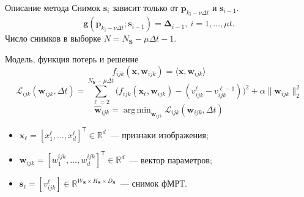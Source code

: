 \documentclass{beamer}
\newcommand{\T}{^{\mathsf{T}}}
\DeclareMathOperator*{\argmin}{arg\,min}  %
\begin{document}
\begin{frame}{Описание метода}
    Снимок $\mathbf{s}_i$ зависит только от $\mathbf{p}_{k_i - \nu \Delta t}$ и $\mathbf{s}_{i-1}$.
	\begin{equation*}
		\label{eq4}
		\mathbf{g}(\mathbf{p}_{k_i - \nu \Delta t}; \mathbf{s}_{i-1}) = \mathbf{\Delta}_{i-1}, \ i = 1, \ldots, \mu t.
	\end{equation*}
    Число снимков в выборке $N = N_{\mathbf{S}} - \mu \Delta t - 1$.
    \begin{block}{Модель, функция потерь и решение}
        \begin{equation*}
            \label{eq5}
            f_{ijk}(\mathbf{x}, \mathbf{w}_{ijk}) = \langle \mathbf{x}, \mathbf{w}_{ijk} \rangle
        \end{equation*}
        \begin{equation*}
            \label{eq6}
            \mathcal{L}_{ijk}(\mathbf{w}_{ijk}, \Delta t) = \sum\limits_{\ell = 2}^{N_{\mathbf{S}} - \mu \Delta t} \big(f_{ijk}(\mathbf{x}_{\ell}, \mathbf{w}_{ijk}) - (v^{\ell}_{ijk} - v^{\ell-1}_{ijk})\big)^2 + \alpha \| \mathbf{w}_{ijk} \|_2^2
        \end{equation*}
        \begin{equation*}
            \label{eq7}
            \hat{\mathbf{w}}_{ijk} = \argmin_{\mathbf{w}_{ijk}} \mathcal{L}_{ijk}(\mathbf{w}_{ijk}, \Delta t)
        \end{equation*}
        \begin{itemize}
            \item $\mathbf{x}_{\ell} = [x^{\ell}_1, \ldots, x^{\ell}_{d}]\T \in \mathbb{R}^{d}$~--- признаки изображения;
            \item $\mathbf{w}_{ijk} = [w^{ijk}_1, \ldots, w^{ijk}_{d}]\T \in \mathbb{R}^{d}$~--- вектор параметров;
            \item $\mathbf{s}_{\ell} = [v^{\ell}_{ijk}] \in \mathbb{R}^{W_{\mathbf{S}} \times H_{\mathbf{S}} \times D_{\mathbf{S}}}$~--- снимок фМРТ.
        \end{itemize}
    \end{block}
\end{frame}
\end{document}
